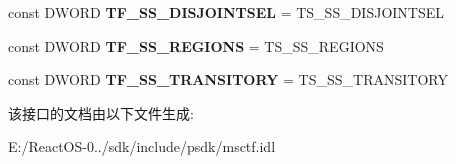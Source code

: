 \begin{DoxyCompactItemize}
\mbox{\label{interface_i_tf_context_a024e6874d2b51af350ed70763ce86b1d}} 
const D\+W\+O\+RD {\bfseries T\+F\+\_\+\+S\+S\+\_\+\+D\+I\+S\+J\+O\+I\+N\+T\+S\+EL} = T\+S\+\_\+\+S\+S\+\_\+\+D\+I\+S\+J\+O\+I\+N\+T\+S\+EL
\item 
\mbox{\label{interface_i_tf_context_a509e8f334c818d9276396a4b6d479a06}} 
const D\+W\+O\+RD {\bfseries T\+F\+\_\+\+S\+S\+\_\+\+R\+E\+G\+I\+O\+NS} = T\+S\+\_\+\+S\+S\+\_\+\+R\+E\+G\+I\+O\+NS
\item 
\mbox{\label{interface_i_tf_context_ac6ba4383f3f3c70bf779e5c3c1067ac0}} 
const D\+W\+O\+RD {\bfseries T\+F\+\_\+\+S\+S\+\_\+\+T\+R\+A\+N\+S\+I\+T\+O\+RY} = T\+S\+\_\+\+S\+S\+\_\+\+T\+R\+A\+N\+S\+I\+T\+O\+RY
\end{DoxyCompactItemize}


该接口的文档由以下文件生成\+:\begin{DoxyCompactItemize}
\item 
E\+:/\+React\+O\+S-\/0../sdk/include/psdk/msctf.\+idl\end{DoxyCompactItemize}
